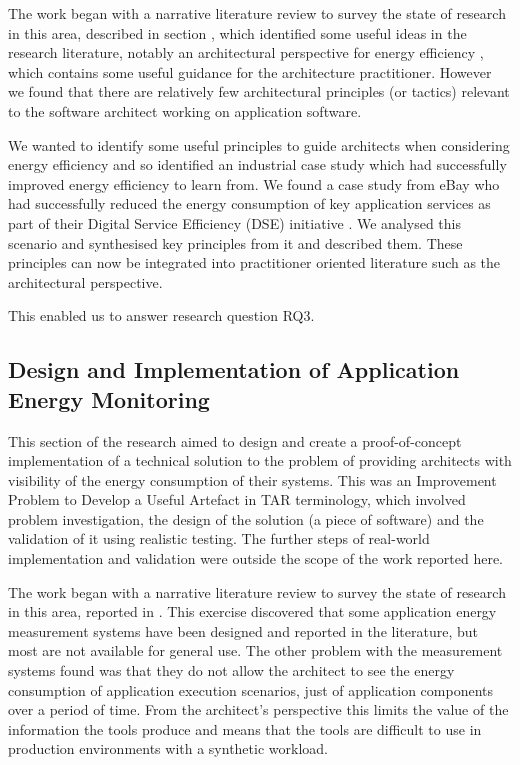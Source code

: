 The work began with a narrative literature review to survey the state of research in this area, described in section , which identified some useful ideas in the research literature, notably an architectural perspective for energy efficiency \cite{jagroep2017-energyperspective}, which contains some useful guidance for the architecture practitioner.  However we found that there are relatively few architectural principles (or tactics) relevant to the software architect working on application software.

We wanted to identify some useful principles to guide architects when considering energy efficiency and so identified an industrial case study which had successfully improved energy efficiency to learn from.  We found a case study from eBay who had successfully reduced the energy consumption of key application services as part of their Digital Service Efficiency (DSE) initiative \cite{ebay2013-digitalefficiency}.  We analysed this scenario and synthesised key principles from it and described them.  These principles can now be integrated into practitioner oriented literature such as the architectural perspective. 

This enabled us to answer research question RQ3.

\subsection{Design and Implementation of Application Energy Monitoring}

This section of the research aimed to design and create a proof-of-concept implementation of a technical solution to the problem of providing architects with visibility of the energy consumption of their systems.  This was an Improvement Problem to Develop a Useful Artefact in TAR terminology, which involved problem investigation, the design of the solution (a piece of software) and the validation of it using realistic testing.  The further steps of real-world implementation and validation \cite{wieringa2012-tar} were outside the scope of the work reported here.

The work began with a narrative literature review to survey the state of research in this area, reported in .  This exercise discovered that some application energy measurement systems have been designed and reported in the literature, but most are not available for general use.  The other problem with the measurement systems found was that they do not allow the architect to see the energy consumption of application execution scenarios, just of application components over a period of time.  From the architect's perspective this limits the value of the information the tools produce and means that the tools are difficult to use in production environments with a synthetic workload.

